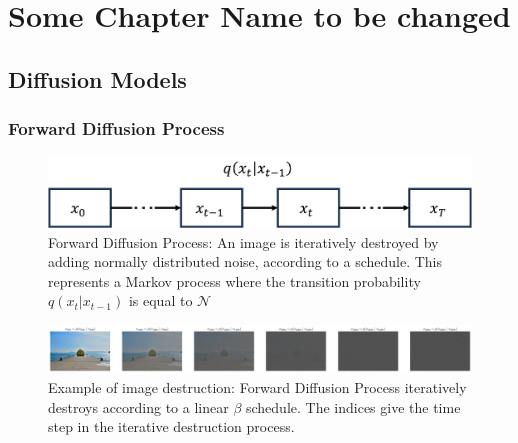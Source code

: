 \chapter{Some Chapter Name to be changed}

\section{Diffusion Models}
\subsection{Forward Diffusion Process}

\begin{figure}[h]
    \centering
    \includegraphics[width=\textwidth]{img/forward_diffusion.png}
    \caption{Forward Diffusion Process: An image is iteratively destroyed by adding normally distributed noise, 
    according to a schedule. This represents a Markov process where the transition probability $q(x_t|x_{t-1})$ 
    is equal to $\mathcal{N}$}
    \label{fig:forward_diffusion}
\end{figure}

\begin{figure}
    \centering
    \includegraphics[width=\textwidth]{img/forward_naoshima.png}
    \caption{Example of image destruction: Forward Diffusion Process iteratively destroys according to a linear $\beta$ schedule.
    The indices give the time step in the iterative destruction process.}
\end{figure}